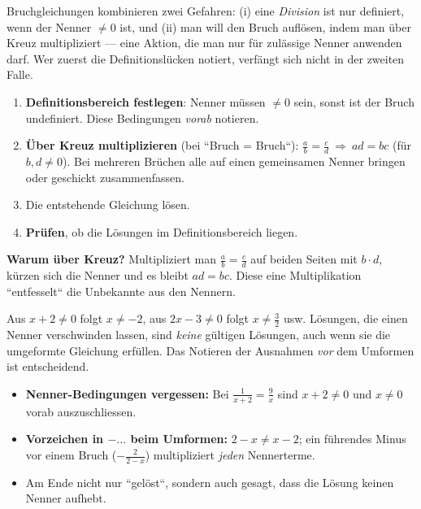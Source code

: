 


Bruchgleichungen kombinieren zwei Gefahren: (i) eine \emph{Division} ist
nur definiert, wenn der Nenner $\neq0$ ist, und (ii) man will den Bruch
auflösen, indem man über Kreuz multipliziert --- eine Aktion, die man nur
für zulässige Nenner anwenden darf. Wer zuerst die Definitionslücken
notiert, verfängt sich nicht in der zweiten Falle.

\begin{werkzeugkasten}
\begin{enumerate}
  \item \textbf{Definitionsbereich festlegen}: Nenner müssen $\neq0$ sein,
        sonst ist der Bruch undefiniert. Diese Bedingungen \emph{vorab}
        notieren.
  \item \textbf{Über Kreuz multiplizieren} (bei ``Bruch = Bruch``):
        $\frac{a}{b}=\frac{c}{d}\ \Rightarrow\ ad=bc$ (für $b,d\neq0$).
        Bei mehreren Brüchen alle auf einen gemeinsamen Nenner bringen
        oder geschickt zusammenfassen.
  \item Die entstehende Gleichung lösen.
  \item \textbf{Prüfen}, ob die Lösungen im Definitionsbereich liegen.
\end{enumerate}
\textbf{Warum über Kreuz?} Multipliziert man $\frac ab=\frac cd$ auf
beiden Seiten mit $b\cdot d$, kürzen sich die Nenner und es bleibt
$ad=bc$. Diese eine Multiplikation ``entfesselt`` die Unbekannte aus den
Nennern.
\end{werkzeugkasten}

\begin{werkzeugkasten}
Aus $x+2\neq0$ folgt $x\neq-2$, aus $2x-3\neq0$ folgt $x\neq\tfrac32$
usw. Lösungen, die einen Nenner verschwinden lassen, sind \emph{keine}
gültigen Lösungen, auch wenn sie die umgeformte Gleichung erfüllen. Das
Notieren der Ausnahmen \emph{vor} dem Umformen ist entscheidend.
\end{werkzeugkasten}

\begin{achtung}
\begin{itemize}
  \item \textbf{Nenner-Bedingungen vergessen:} Bei $\frac1{x+2}=\frac9x$
        sind $x+2\neq0$ und $x\neq0$ vorab auszuschliessen.
  \item \textbf{Vorzeichen in $-...$ beim Umformen:}
        $2-x\neq x-2$; ein f\"uhrendes Minus vor einem Bruch
        ($-\frac{2}{2-x}$) multipliziert \emph{jeden} Nennerterme.
  \item Am Ende nicht nur ``gelöst``, sondern auch gesagt, dass die
        Lösung keinen Nenner aufhebt.
\end{itemize}
\end{achtung}

